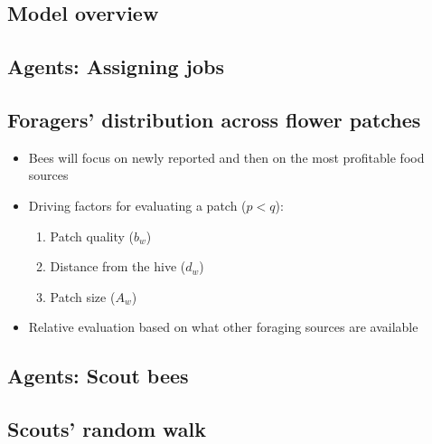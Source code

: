 \documentclass[
	paper=128mm:96mm,
	fontsize=11pt,
	pagesize,
	parskip=half-,
]{scrartcl}
\theoremstyle{mythmstyle} %
\begin{document}
	\clearpage


\subsection{Model overview}
	
	\clearpage


\subsection{Agents: Assigning jobs}
	
	\clearpage


\subsection{Foragers' distribution across flower patches}
	\begin{itemize}
		\item Bees will focus on newly reported and then on the most profitable food sources
		\item Driving factors for evaluating a patch ($p < q$):
		\begin{enumerate}
			\item Patch quality ($b_w$)
			\item Distance from the hive ($d_w$)
			\item Patch size ($A_w$)
		\end{enumerate}
		\item Relative evaluation based on what other foraging sources are available
	\end{itemize}
	\clearpage


\subsection{Agents: Scout bees}
	
	\clearpage



\subsection{Scouts' random walk}
	
	\clearpage
\end{document}

